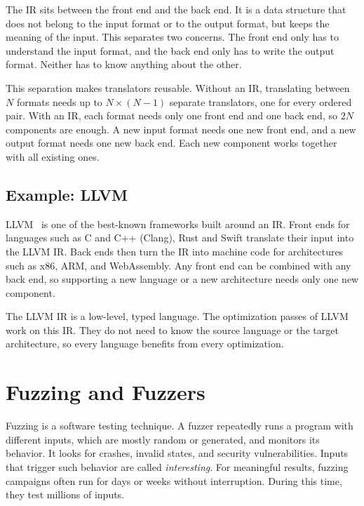 \documentclass[thesis]{plai}
\begin{document}
The IR sits between the front end and the back end. It is a data structure that does not belong to the input format or to the output format, but keeps the meaning of the input. This separates two concerns. The front end only has to understand the input format, and the back end only has to write the output format. Neither has to know anything about the other.

This separation makes translators reusable. Without an IR, translating between $N$ formats needs up to $N \times (N-1)$ separate translators, one for every ordered pair. With an IR, each format needs only one front end and one back end, so $2N$ components are enough. A new input format needs one new front end, and a new output format needs one new back end. Each new component works together with all existing ones.

\subsection{Example: LLVM} 
LLVM~\cite{lattner04-llvm} is one of the best-known frameworks built around an IR. Front ends for languages such as C and C++ (Clang), Rust and Swift translate their input into the LLVM IR. Back ends then turn the IR into machine code for architectures such as x86, ARM, and WebAssembly. Any front end can be combined with any back end, so supporting a new language or a new architecture needs only one new component.

The LLVM IR is a low-level, typed language. The optimization passes of LLVM work on this IR. They do not need to know the source language or the target architecture, so every language benefits from every optimization.

\section{Fuzzing and Fuzzers}
\label{section:fuzzing}
Fuzzing is a software testing technique. A fuzzer repeatedly runs a program with different inputs, which are mostly random or generated, and monitors its behavior. It looks for crashes, invalid states, and security vulnerabilities. Inputs that trigger such behavior are called \emph{interesting}. For meaningful results, fuzzing campaigns often run for days or weeks without interruption. During this time, they test millions of inputs.
\end{document}
